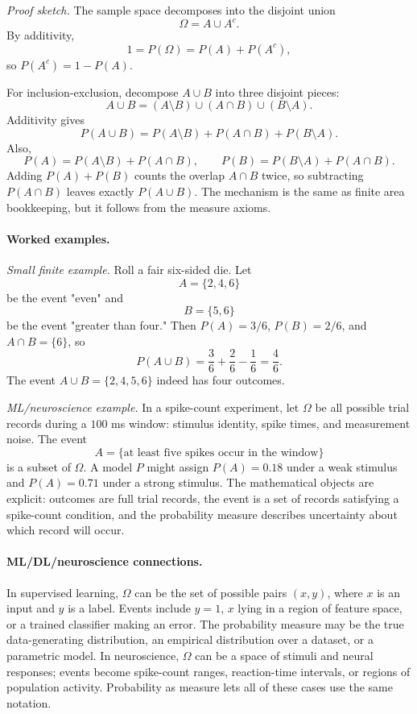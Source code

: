 \emph{Proof sketch.}
The sample space decomposes into the disjoint union
\[
\Omega=A\cup A^c.
\]
By additivity,
\[
1=P(\Omega)=P(A)+P(A^c),
\]
so \(P(A^c)=1-P(A)\).

For inclusion-exclusion, decompose \(A\cup B\) into three disjoint pieces:
\[
A\cup B
=
(A\setminus B)\cup(A\cap B)\cup(B\setminus A).
\]
Additivity gives
\[
P(A\cup B)
=P(A\setminus B)+P(A\cap B)+P(B\setminus A).
\]
Also,
\[
P(A)=P(A\setminus B)+P(A\cap B),
\qquad
P(B)=P(B\setminus A)+P(A\cap B).
\]
Adding \(P(A)+P(B)\) counts the overlap \(A\cap B\) twice, so subtracting \(P(A\cap B)\) leaves exactly \(P(A\cup B)\). The mechanism is the same as finite area bookkeeping, but it follows from the measure axioms.

\paragraph{Worked examples.}
\emph{Small finite example.} Roll a fair six-sided die. Let
\[
A=\{2,4,6\}
\]
be the event "even" and
\[
B=\{5,6\}
\]
be the event "greater than four." Then \(P(A)=3/6\), \(P(B)=2/6\), and \(A\cap B=\{6\}\), so
\[
P(A\cup B)=\frac{3}{6}+\frac{2}{6}-\frac{1}{6}=\frac{4}{6}.
\]
The event \(A\cup B=\{2,4,5,6\}\) indeed has four outcomes.

\emph{ML/neuroscience example.} In a spike-count experiment, let \(\Omega\) be all possible trial records during a \(100\) ms window: stimulus identity, spike times, and measurement noise. The event
\[
A=\{\text{at least five spikes occur in the window}\}
\]
is a subset of \(\Omega\). A model \(P\) might assign \(P(A)=0.18\) under a weak stimulus and \(P(A)=0.71\) under a strong stimulus. The mathematical objects are explicit: outcomes are full trial records, the event is a set of records satisfying a spike-count condition, and the probability measure describes uncertainty about which record will occur.

\paragraph{ML/DL/neuroscience connections.}
In supervised learning, \(\Omega\) can be the set of possible pairs \((x,y)\), where \(x\) is an input and \(y\) is a label. Events include \(y=1\), \(x\) lying in a region of feature space, or a trained classifier making an error. The probability measure may be the true data-generating distribution, an empirical distribution over a dataset, or a parametric model. In neuroscience, \(\Omega\) can be a space of stimuli and neural responses; events become spike-count ranges, reaction-time intervals, or regions of population activity. Probability as measure lets all of these cases use the same notation.

